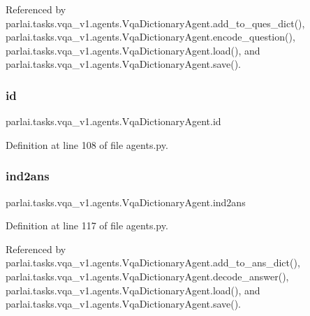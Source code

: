 Referenced by parlai.\+tasks.\+vqa\+\_\+v1.\+agents.\+Vqa\+Dictionary\+Agent.\+add\+\_\+to\+\_\+ques\+\_\+dict(), parlai.\+tasks.\+vqa\+\_\+v1.\+agents.\+Vqa\+Dictionary\+Agent.\+encode\+\_\+question(), parlai.\+tasks.\+vqa\+\_\+v1.\+agents.\+Vqa\+Dictionary\+Agent.\+load(), and parlai.\+tasks.\+vqa\+\_\+v1.\+agents.\+Vqa\+Dictionary\+Agent.\+save().

\mbox{\label{classparlai_1_1tasks_1_1vqa__v1_1_1agents_1_1VqaDictionaryAgent_a91f3e9070c98389aa082ac35481da54e}} 
\subsubsection{\texorpdfstring{id}{id}}
{\footnotesize\ttfamily parlai.\+tasks.\+vqa\+\_\+v1.\+agents.\+Vqa\+Dictionary\+Agent.\+id}



Definition at line 108 of file agents.\+py.

\mbox{\label{classparlai_1_1tasks_1_1vqa__v1_1_1agents_1_1VqaDictionaryAgent_ae11eca250a8c26cdae4f55f8a654d645}} 
\subsubsection{\texorpdfstring{ind2ans}{ind2ans}}
{\footnotesize\ttfamily parlai.\+tasks.\+vqa\+\_\+v1.\+agents.\+Vqa\+Dictionary\+Agent.\+ind2ans}



Definition at line 117 of file agents.\+py.



Referenced by parlai.\+tasks.\+vqa\+\_\+v1.\+agents.\+Vqa\+Dictionary\+Agent.\+add\+\_\+to\+\_\+ans\+\_\+dict(), parlai.\+tasks.\+vqa\+\_\+v1.\+agents.\+Vqa\+Dictionary\+Agent.\+decode\+\_\+answer(), parlai.\+tasks.\+vqa\+\_\+v1.\+agents.\+Vqa\+Dictionary\+Agent.\+load(), and parlai.\+tasks.\+vqa\+\_\+v1.\+agents.\+Vqa\+Dictionary\+Agent.\+save().


